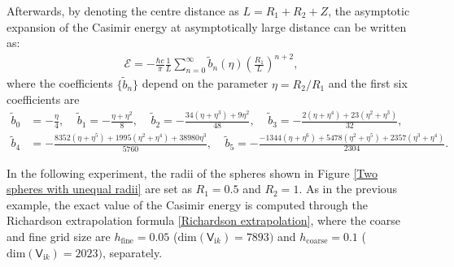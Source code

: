 Afterwards, by denoting the centre distance as
$L = R_{1} + R_{2} + Z$, the asymptotic expansion of the Casimir energy at asymptotically large distance can be written as:
\begin{align}\label{Asymptotic unequal radii}
    \mathcal{E} = -\frac{\hbar c}{\pi}\frac{1}{L}\sum_{n=0}^{\infty}\tilde{b}_{n}(\eta)\left(\frac{R_{1}}{L}\right)^{n+2},
\end{align}
where the coefficients $\{\tilde{b}_{n}\}$ depend on the parameter $\eta = R_{2}/R_{1}$ and the first six coefficients are
\begin{align*}
    \tilde{b}_{0} &= -\frac{\eta}{4}, \ \ \ \ \ \tilde{b}_{1} = -\frac{\eta + \eta^{2}}{8}, \ \ \ \ \  \tilde{b}_{2} = -\frac{34(\eta+\eta^{3})+ 9\eta^{2}}{48}, \ \ \ \ \ \tilde{b}_{3} = -\frac{2(\eta+\eta^{4}) + 23(\eta^{2} + \eta^{3})}{32}, \\ 
    \tilde{b}_{4} &= -\frac{8352(\eta + \eta^{5})+ 1995(\eta^{2} + \eta^{4}) + 38980\eta^{3}}{5760}, \ \ \ \ \ \tilde{b}_{5} = -\frac{-1344(\eta+\eta^{6}) + 5478(\eta^{2} + \eta^{5})+2357(\eta^{3} + \eta^{4})}{2304}.
\end{align*}

In the following experiment, the radii of the spheres shown in Figure \ref{Two spheres with unequal radii} are set as $R_{1} = 0.5$ and $ R_{2} = 1$. 
As in the previous example, the exact value of the Casimir energy is computed through the Richardson extrapolation formula \eqref{Richardson extrapolation}, 
where the coarse and fine grid size are $h_{\text{fine}} = 0.05$ ($\text{dim}(\mathsf{V}_{\mathrm{i}k}) = 7893)$ and 
$h_{\text{coarse}} = 0.1$ ($\text{dim}(\mathsf{V}_{\mathrm{i}k}) = 2023)$, separately. 


